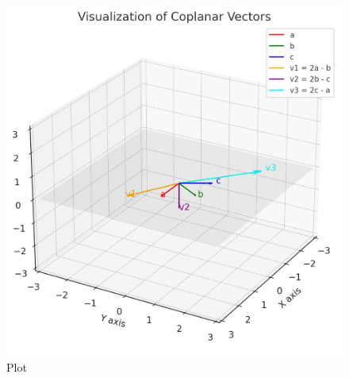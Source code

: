 \documentclass{beamer}
\begin{document}
\begin{frame}
\begin{figure}[H]
    \centering
    \includegraphics[width=0.7\columnwidth]{graph-1.png}
    \caption{Plot}
    \label{fig:placeholder}
\end{figure}
\end{frame}
\end{document}
